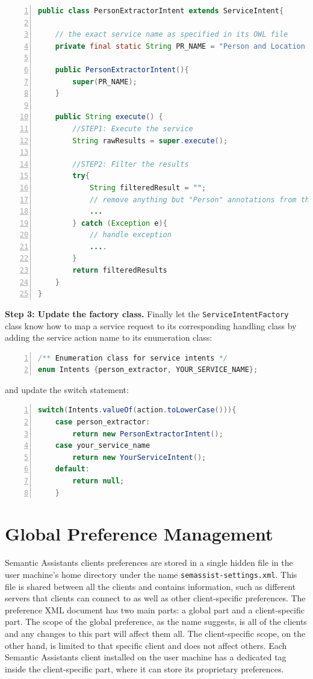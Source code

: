 \begin{lstlisting}[language=Java,numbers=left,xleftmargin=4mm,columns=flexible]
public class PersonExtractorIntent extends ServiceIntent{

	// the exact service name as specified in its OWL file
	private final static String PR_NAME = "Person and Location Extractor";

	public PersonExtractorIntent(){
		super(PR_NAME);
	}

	public String execute() {
		//STEP1: Execute the service
		String rawResults = super.execute();

		//STEP2: Filter the results
		try{
			String filteredResult = "";
			// remove anything but "Person" annotations from the rawResults
			...
		} catch (Exception e){
			// handle exception
			....
		}
		return filteredResults
	}
}
\end{lstlisting}

\blankline
\noindent
\textbf{Step 3: Update the factory class. }
Finally let the \texttt{ServiceIntentFactory} class know how to map a service request to its corresponding handling class by adding the service action name to its enumeration class:

\begin{lstlisting}[language=Java,numbers=left,xleftmargin=4mm,columns=flexible]
/** Enumeration class for service intents */
enum Intents {person_extractor, YOUR_SERVICE_NAME};
\end{lstlisting}

\blankline
\noindent
and update the switch statement:

\begin{lstlisting}[language=Java,numbers=left,xleftmargin=4mm,columns=flexible]
switch(Intents.valueOf(action.toLowerCase())){
	case person_extractor:
		return new PersonExtractorIntent();
	case your_service_name
		return new YourServiceIntent();
	default:
		return null;
	}
\end{lstlisting}

\section{Global Preference Management}
\label{sec:pref_management}
Semantic Assistants clients preferences are stored in a single hidden file in the user machine's home directory under the name \texttt{semassist-settings.xml}. This file is shared between all the clients and contains information, such as different servers that clients can connect to as well as other client-specific preferences. The preference XML document has two main parts: a global part and a client-specific part. The scope of the global preference, as the name suggests, is all of the clients and any changes to this part will affect them all. The client-specific scope, on the other hand, is limited to that specific client and does not affect others. Each Semantic Assistants client installed on the user machine has a dedicated tag inside the client-specific part, where it can store its proprietary preferences.

